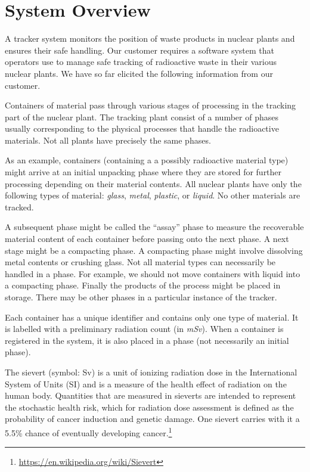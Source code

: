 \documentclass[fontsize=12pt,paper=letter,twoside]{scrartcl}
\begin{document}
\newpage

\tableofcontents
\listoffigures
\listoftables
\newpage


\section{System Overview}

A tracker system monitors the position of waste products in nuclear plants and ensures their safe handling. Our customer requires a software system that operators use to manage safe tracking of radioactive waste in their various nuclear plants. We have so far elicited the following information from our customer.

Containers of material pass through various stages of processing in the tracking part of the nuclear plant. The tracking plant consist of a number of phases usually corresponding to the physical processes that handle the radioactive materials. Not all plants have precisely the same phases.

As an example, containers (containing a a possibly radioactive material type) might arrive at an initial unpacking phase where they are stored for further processing depending on their material contents. All nuclear plants have only the following types of material: \textit{glass}, \textit{metal}, \textit{plastic}, or \textit{liquid}. No other materials are tracked.

A subsequent phase might be called the ``assay” phase to measure the recoverable material content of each container before passing onto the next phase. A next stage might be a compacting phase. A compacting phase might involve dissolving metal contents or crushing glass. Not all material types can necessarily be handled in a phase. For example, we should not move containers with liquid into a compacting phase. Finally the products of the process might be placed in storage. There may be other phases in a particular instance of the tracker.

Each container has a unique identifier and contains only one type of material. It is labelled with a preliminary radiation count (in \textit{mSv}). When a container is registered in the system, it is also placed in a phase (not necessarily an initial phase).

The sievert (symbol: Sv) is a unit of ionizing radiation dose in the International System of Units (SI) and is a measure of the health effect of radiation on the human body. Quantities that are measured in sieverts are intended to represent the stochastic health risk, which for radiation dose assessment is defined as the probability of cancer induction and genetic damage. One sievert carries with it a 5.5\% chance of eventually developing cancer.\footnote{\url{https://en.wikipedia.org/wiki/Sievert}}
\end{document}
